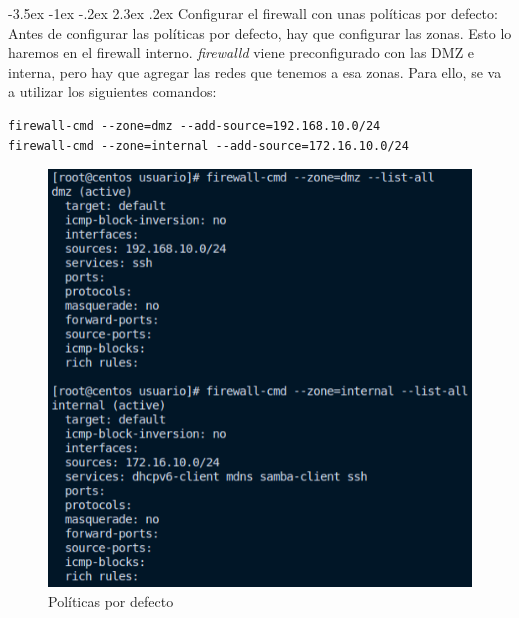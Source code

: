 \documentclass[11pt]{report}
\makeatletter
\renewcommand\chapter{\@startsection{chapter}{0}{\z@}%
    {-3.5ex \@plus -1ex \@minus -.2ex}%
    {2.3ex \@plus.2ex}%
    {\normalfont\Large\bfseries}}
\makeatother
\begin{document}
\cleardoublepage

\chapter{Configurar el firewall con unas políticas por defecto: }
Antes de configurar las políticas por defecto, hay que configurar las zonas. Esto lo haremos en el firewall interno.
\emph{firewalld} viene preconfigurado con las DMZ e interna, pero hay que agregar las redes que tenemos a esa zonas. 
Para ello, se va a utilizar los siguientes comandos:
\begin{verbatim}
firewall-cmd --zone=dmz --add-source=192.168.10.0/24
firewall-cmd --zone=internal --add-source=172.16.10.0/24
\end{verbatim}
\begin{figure}[H]
  \centering
  \includegraphics[scale=0.65]{img/resultado_politicas_por_defecto.png}
  \caption{Políticas por defecto}
  \label{fig:politicas por defecto}
\end{figure}
\end{document}
